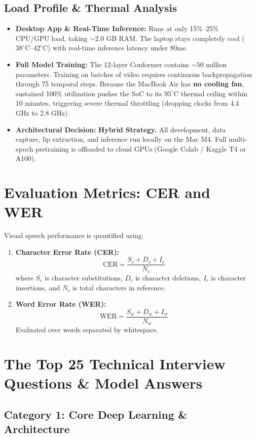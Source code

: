 \documentclass[11pt,a4paper]{article}
\begin{document}
\subsection{Load Profile \& Thermal Analysis}
\begin{itemize}
    \item \textbf{Desktop App \& Real-Time Inference:} Runs at only 15\%--25\% CPU/GPU load, taking $\sim 2.0$ GB RAM. The laptop stays completely cool ($38^\circ\text{C}$--$42^\circ\text{C}$) with real-time inference latency under 80ms.
    \item \textbf{Full Model Training:} The 12-layer Conformer contains $\sim 50$ million parameters. Training on batches of video requires continuous backpropagation through 75 temporal steps. Because the MacBook Air has \textbf{no cooling fan}, sustained 100\% utilization pushes the SoC to its $95^\circ\text{C}$ thermal ceiling within 10 minutes, triggering severe thermal throttling (dropping clocks from 4.4 GHz to 2.8 GHz).
    \item \textbf{Architectural Decision:} \textbf{Hybrid Strategy.} All development, data capture, lip extraction, and inference run locally on the Mac M4. Full multi-epoch pretraining is offloaded to cloud GPUs (Google Colab / Kaggle T4 or A100).
\end{itemize}

\section{Evaluation Metrics: CER and WER}
Visual speech performance is quantified using:
\begin{enumerate}
    \item \textbf{Character Error Rate (CER):}
    $$\text{CER} = \frac{S_c + D_c + I_c}{N_c}$$
    where $S_c$ is character substitutions, $D_c$ is character deletions, $I_c$ is character insertions, and $N_c$ is total characters in reference.
    \item \textbf{Word Error Rate (WER):}
    $$\text{WER} = \frac{S_w + D_w + I_w}{N_w}$$
    Evaluated over words separated by whitespace.
\end{enumerate}

\section{The Top 25 Technical Interview Questions \& Model Answers}
\subsection{Category 1: Core Deep Learning \& Architecture}
\end{document}
